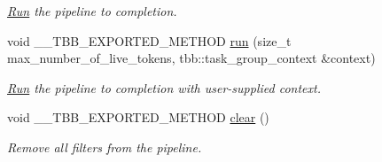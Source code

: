 \begin{DoxyCompactItemize}
\begin{DoxyCompactList}\small\item\em \hyperlink{structRun}{Run} the pipeline to completion. \end{DoxyCompactList}\item 
\hypertarget{classtbb_1_1pipeline_a270dba81f7dd9935be7f3d69db907ff4}{}void \+\_\+\+\_\+\+T\+B\+B\+\_\+\+E\+X\+P\+O\+R\+T\+E\+D\+\_\+\+M\+E\+T\+H\+O\+D \hyperlink{classtbb_1_1pipeline_a270dba81f7dd9935be7f3d69db907ff4}{run} (size\+\_\+t max\+\_\+number\+\_\+of\+\_\+live\+\_\+tokens, tbb\+::task\+\_\+group\+\_\+context \&context)\label{classtbb_1_1pipeline_a270dba81f7dd9935be7f3d69db907ff4}

\begin{DoxyCompactList}\small\item\em \hyperlink{structRun}{Run} the pipeline to completion with user-\/supplied context. \end{DoxyCompactList}\item 
\hypertarget{classtbb_1_1pipeline_af092e3e991e6995e3d08cdd628b30f7d}{}void \+\_\+\+\_\+\+T\+B\+B\+\_\+\+E\+X\+P\+O\+R\+T\+E\+D\+\_\+\+M\+E\+T\+H\+O\+D \hyperlink{classtbb_1_1pipeline_af092e3e991e6995e3d08cdd628b30f7d}{clear} ()\label{classtbb_1_1pipeline_af092e3e991e6995e3d08cdd628b30f7d}

\begin{DoxyCompactList}\small\item\em Remove all filters from the pipeline. \end{DoxyCompactList}\end{DoxyCompactItemize}
